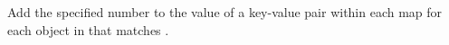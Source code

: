 Add the specified number to the value of a key-value pair within each map for
each object in  that matches .


